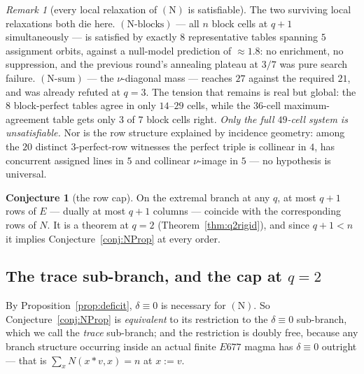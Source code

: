 \documentclass[11pt]{article}
\theoremstyle{plain}
\theoremstyle{definition}
\newtheorem{conjecture}[theorem]{Conjecture}
\theoremstyle{remark}
\newtheorem*{remark*}{Remark}
\numberwithin{equation}{section}
\newcommand{\op}{\mathbin{*}}
\begin{document}
\begin{remark*}[every local relaxation of $(\mathrm{N})$ is satisfiable]
The two surviving local relaxations both die here. $(\mathrm{N}\text{-blocks})$
--- all $n$ block cells at $q+1$ simultaneously --- is satisfied by exactly $8$
representative tables spanning $5$ assignment orbits, against a null-model
prediction of $\approx1.8$: no enrichment, no suppression, and the previous
round's annealing plateau at $3/7$ was pure search failure.
$(\mathrm{N}\text{-sum})$ --- the $\nu$-diagonal mass --- reaches $27$ against the
required $21$, and was already refuted at $q = 3$. The tension that remains is
real but global: the $8$ block-perfect tables agree in only $14$--$29$ cells,
while the $36$-cell maximum-agreement table gets only $3$ of $7$ block cells
right. \emph{Only the full $49$-cell system is unsatisfiable.} Nor is the row
structure explained by incidence geometry: among the $20$ distinct
$3$-perfect-row witnesses the perfect triple is collinear in $4$, has concurrent
assigned lines in $5$ and collinear $\nu$-image in $5$ --- no hypothesis is
universal.
\end{remark*}

\begin{conjecture}[the row cap]\label{conj:rowcap}
On the extremal branch at any $q$, at most $q+1$ rows of $E$ --- dually at most
$q+1$ columns --- coincide with the corresponding rows of $N$. It is a theorem at
$q = 2$ (Theorem~\ref{thm:q2rigid}), and since $q+1 < n$ it implies
Conjecture~\ref{conj:NProp} at every order.
\end{conjecture}

\subsection{The trace sub-branch, and the cap at $q = 2$}\label{sec:trace}

By Proposition~\ref{prop:deficit}, $\delta\equiv0$ is necessary for
$(\mathrm{N})$. So Conjecture~\ref{conj:NProp} is \emph{equivalent} to its
restriction to the $\delta\equiv0$ sub-branch, which we call the \emph{trace}
sub-branch; and the restriction is doubly free, because any branch structure
occurring inside an actual finite $E677$ magma has $\delta\equiv0$ outright ---
that is $\sum_xN(x\op v,x) = n$ at $x := v$.
\end{document}

